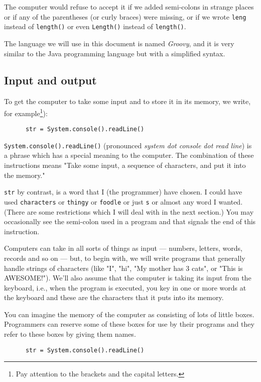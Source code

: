 The computer would refuse to accept it if we added semi-colons in strange places
or if any of the parentheses (or curly braces) were missing, or if we wrote
\verb!leng! instead of \verb!length()! or even \verb!Length()! instead of \verb!length()!.

The language we will use in this document is named \emph{Groovy}, and
it is very similar to the Java programming language but with a
simplified syntax. 

\subsection{Input and output}

To get the computer to take some input and to store it
in its memory, we write, for example\footnote{Pay attention to the brackets
and the capital letters.}):

\begin{Verbatim}
      str = System.console().readLine()
\end{Verbatim}

\verb!System.console().readLine()! (pronounced \emph{system dot
  console dot read line}) is a phrase which has a special meaning to
the computer.  The combination of these instructions means "Take
some input, a sequence of characters, and put it into the memory."

\verb!str! by contrast, is a word that I (the programmer) have chosen.
I could have used \verb!characters! or \verb!thingy! or \verb!foodle!
or just \verb!s! or almost any word I wanted. (There are some
restrictions which I will deal with in the next section.)  You may
occasionally see the semi-colon used in a program and that signals the
end of this instruction.

Computers can take in all sorts of things as input --- numbers,
letters, words, records and so on --- but, to begin with, we will
write programs that generally handle strings of characters (like
"I", "hi", "My mother has 3 cats", or "This is AWESOME!").
We'll also assume that the computer is taking its input from the
keyboard, i.e., when the program is executed, you key in one or more
words at the keyboard and these are the characters that it puts into
its memory.

You can imagine the memory of the computer as consisting of lots of
little boxes.  Programmers can reserve some of these boxes for
use by their programs and they refer to these boxes by giving
them names.  

\begin{Verbatim}
      str = System.console().readLine()
\end{Verbatim}

